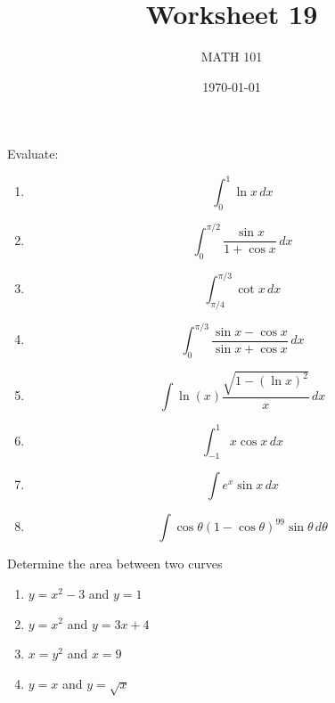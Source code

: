 \documentclass[12pt]{amsart}
\title{ Worksheet 19}
\author{MATH 101}
\date{\today}
\begin{document}
\maketitle

\begin{problem}
Evaluate:

\begin{enumerate}
	\item $$\int_0^1 \ln x \, dx$$
	      \vspace{7cm}
	\item $$ \int_0^{\pi/2} \frac{\sin x}{1 + \cos x} \, dx $$
	      \vspace{7cm}
	\item $$ \int_{\pi/4}^{\pi/3} \cot x \, dx $$
	      \vspace{7cm}
	\item $$ \int_{0}^{\pi/3} \frac{ \sin x - \cos x}{ \sin x + \cos x} \, dx $$
	      \vspace{7cm}
	\item $$ \int \ln (x) \frac{ \sqrt{1 - (\ln x)^2 }}{x} \, dx $$
	      \vspace{7cm}
	\item $$ \int_{-1}^1 x \cos x \, dx $$
	      \vspace{7cm}
	\item $$ \int e^x \sin x \, dx $$
	      \vspace{7cm}
	\item $$ \int \cos \theta ( 1 - \cos \theta )^{99} \sin \theta \, d\theta $$
	      \vspace{7cm}
\end{enumerate}
\end{problem}


\begin{problem}
Determine the area between two curves
\begin{enumerate}
	\item $ y = x^2 - 3$ and $y =1$
	      \vspace{7cm}
	\item $ y = x^2$ and $y = 3x + 4$
	      \vspace{7cm}
	\item $ x = y^2$ and $x = 9$
	      \vspace{7cm}
	\item $ y = x$ and $y =\sqrt{x}$
	      \vspace{7cm}
\end{enumerate}
\end{problem}
\end{document}
